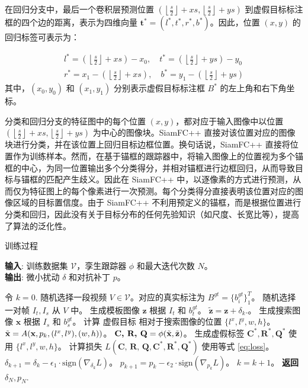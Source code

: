 在回归分支中，最后一个卷积层预测位置 $\left(\left\lfloor\frac{s}{2}\right\rfloor+x s,\left\lfloor\frac{s}{2}\right\rfloor+y s\right)$ 到虚假目标标注框的四个边的距离，表示为四维向量 $\boldsymbol{t}^{*}=\left(l^{*}, t^{*}, r^{*}, b^{*}\right)$。因此，位置 $(x,y)$ 的回归标签可表示为：

\begin{equation}
\begin{array}{ll}
l^{*}=\left(\left\lfloor\frac{s}{2}\right\rfloor+x s\right)-x_{0}, \quad t^{*}=\left(\left\lfloor\frac{s}{2}\right\rfloor+y s\right)-y_{0} \\
r^{*}=x_{1}-\left(\left\lfloor\frac{s}{2}\right\rfloor+x s\right), \quad b^{*}=y_{1}-\left(\left\lfloor\frac{s}{2}\right\rfloor+y s\right)
\end{array}
\end{equation}
其中，$(x_0, y_0)$ 和 $(x_1, y_1)$ 分别表示虚假目标标注框 $B^*$ 的左上角和右下角坐标。

分类和回归分支的特征图中的每个位置 $(x,y)$，都对应于输入图像中以位置 $\left(\left\lfloor\frac{s}{2}\right\rfloor+x s,\left\lfloor\frac{s}{2}\right\rfloor+y s\right)$ 为中心的图像块。SiamFC++ \cite{SiamFC++} 直接对该位置对应的图像块进行分类，并在该位置上回归目标边框位置。换句话说，SiamFC++ 直接将位置作为训练样本。然而，在基于锚框的跟踪器中，将输入图像上的位置视为多个锚框的中心，为同一位置输出多个分类得分，并相对锚框进行边框回归，从而导致目标与锚框的匹配产生歧义。因此在 SiamFC++ 中，以逐像素的方式进行预测，从而仅为特征图上的每个像素进行一次预测。每个分类得分直接表明该位置对应的图像区域的目标置信度。由于 SiamFC++ 不利用预定义的锚框，而是根据位置进行分类和回归，因此没有关于目标分布的任何先验知识（如尺度、长宽比等），提高了算法的泛化性。

\begin{algorithm}[tb]
\caption{训练过程}
\label{alg:algorithm}
\textbf{输入}: 训练数据集 $\mathcal{V}$，孪生跟踪器 $\phi$ 和最大迭代次数 $N$。\\
\textbf{输出}: 微小扰动 $\delta$ 和对抗补丁 $p$。
\begin{algorithmic}[1] %
\State 令 $k = 0$.
\State 随机选择一段视频 $V\in \mathcal{V}$。对应的真实标注为 $B^{gt}=\{b^{gt}_i\}^T_1$。
\State 随机选择一对帧 $I_t, I_s$ 从 $V$ 中。
\State 生成模板图像 $\textbf{z}$ 根据 $I_t$ 和 $b^{gt}_t$。
\State $\tilde{\textbf{z}} = \textbf{z} + \delta_k.$。
\State 生成搜索图像 $\textbf{x}$ 根据 $I_s$ 和 $b^{gt}_s$。
\State 计算 虚假目标 相对于搜索图像的位置 $\{l^x, l^y, w, h\}$。
\State $\tilde{\textbf x} = A(\textbf x, p_k, (l^x, l^y), (w, h))$。
\State $\textbf{C, R, Q} = \phi(\tilde {\textbf x}, \tilde{\textbf z})$。
\State 生成虚假标签 $\textbf{C}^*,\textbf{R}^*,\textbf{Q}^*$ 使用 $\{l^x, l^y, w, h\}$。
\State 计算损失 $L(\textbf{C, R, Q}, \textbf{C}^*, \textbf{R}^*, \textbf{Q}^*)$ 使用等式 \ref{eq:loss}。
\State $\delta_{k+1} = \delta_{k} - \epsilon_1 \cdot \text{sign}(\nabla_{\delta_k}L)$。
\State $p_{k+1} = p_{k} - \epsilon_2 \cdot \text{sign}(\nabla_{p_k}L)$。
\State $k = k + 1$。
\EndWhile
\State \textbf{返回} $\delta_N, p_N.$
\end{algorithmic}
\label{attack_alg}
\end{algorithm}

